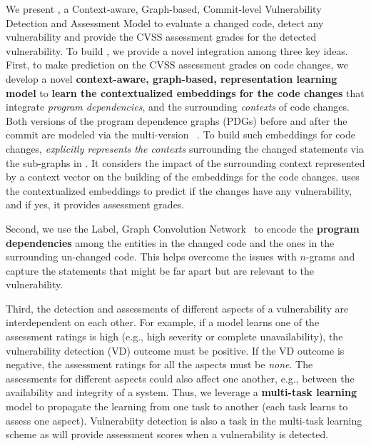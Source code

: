 
We present {\tool}, a Context-aware, Graph-based, Commit-level
Vulnerability Detection and Assessment Model to evaluate a changed
code, detect any vulnerability and provide the CVSS
assessment grades for the detected vulnerability. To build {\tool}, we
provide a novel integration among three key ideas. First, to make
prediction on the CVSS assessment grades on code changes, we develop a
novel {\bf context-aware, graph-based, representation learning 
  model} to {\bf learn the contextualized embeddings for the code
  changes} that integrate {\em program dependencies}, and the
surrounding {\em contexts} of code changes.  Both versions of the
program dependence graphs (PDGs) before and after the commit are
modeled via the multi-version {\mvpdg}~\cite{flexeme-fse20}.
To build such embeddings for code changes, {\tool} {\em explicitly
  represents the contexts} surrounding the changed statements via the
sub-graphs in {\mvpdg}. It considers the impact of the surrounding
context represented by a context vector on the building of the
embeddings for the code changes. {\tool} uses the contextualized
embeddings to predict if the changes have any vulnerability, and if
yes, it provides assessment grades.

Second, we use the Label, Graph Convolution
Network~\cite{label-gcn} to encode the {\bf program dependencies}
among the entities in the changed code and the ones in the
surrounding un-changed code. This helps overcome the issues
with $n$-grams and capture the statements that might be far
apart but are relevant to the vulnerability.

Third, the detection and assessments of different aspects of a
vulnerability are interdependent on each other. For example, if a
model learns one of the assessment ratings is high (e.g., high
severity or complete unavailability), the vulnerability detection (VD) outcome
must be positive. If the VD outcome is negative, the assessment ratings for
all the aspects must be {\em none}. The assessments for different
aspects could also affect one another, e.g., between the availability and
integrity of a system. Thus, we leverage 
a {\bf multi-task learning} model to propagate the learning from one
task to another (each task learns to assess one aspect). Vulnerabiity
detection is also a task in the multi-task learning scheme as {\tool} will
provide assessment scores when a vulnerability is detected.


